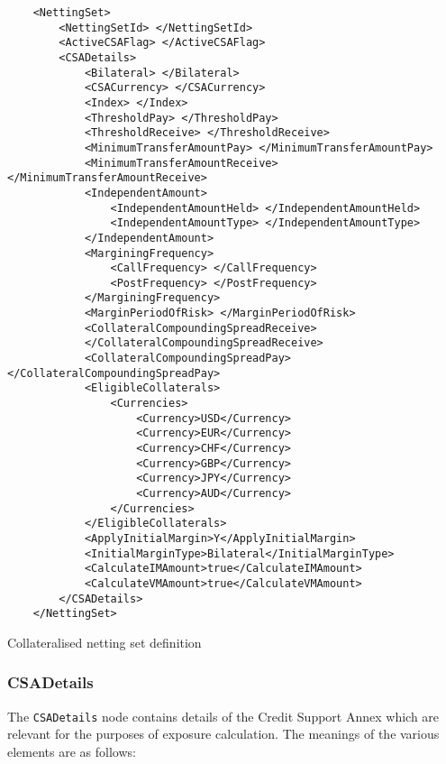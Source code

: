 \begin{listing}[H]
\begin{verbatim}
    <NettingSet>
        <NettingSetId> </NettingSetId>
        <ActiveCSAFlag> </ActiveCSAFlag>
        <CSADetails>
            <Bilateral> </Bilateral>
            <CSACurrency> </CSACurrency>
            <Index> </Index>
            <ThresholdPay> </ThresholdPay>
            <ThresholdReceive> </ThresholdReceive>
            <MinimumTransferAmountPay> </MinimumTransferAmountPay>
            <MinimumTransferAmountReceive> </MinimumTransferAmountReceive>
            <IndependentAmount>
                <IndependentAmountHeld> </IndependentAmountHeld>
                <IndependentAmountType> </IndependentAmountType>
            </IndependentAmount>
            <MarginingFrequency>
                <CallFrequency> </CallFrequency>
                <PostFrequency> </PostFrequency>
            </MarginingFrequency>
            <MarginPeriodOfRisk> </MarginPeriodOfRisk>
            <CollateralCompoundingSpreadReceive> 
            </CollateralCompoundingSpreadReceive>
            <CollateralCompoundingSpreadPay> </CollateralCompoundingSpreadPay>
            <EligibleCollaterals>
                <Currencies>
                    <Currency>USD</Currency>
                    <Currency>EUR</Currency>
                    <Currency>CHF</Currency>
                    <Currency>GBP</Currency>
                    <Currency>JPY</Currency>
                    <Currency>AUD</Currency>
                </Currencies>
            </EligibleCollaterals>
            <ApplyInitialMargin>Y</ApplyInitialMargin>
            <InitialMarginType>Bilateral</InitialMarginType>
            <CalculateIMAmount>true</CalculateIMAmount>
            <CalculateVMAmount>true</CalculateVMAmount>
        </CSADetails>
    </NettingSet>
\end{verbatim}
\caption{Collateralised netting set definition}
\label{lst:nettingSetCollat}
\end{listing}

\subsubsection*{CSADetails}

The \lstinline!CSADetails! node contains details of the Credit Support
Annex which are relevant for the purposes of exposure calculation. The
meanings of the various elements are as follows:

